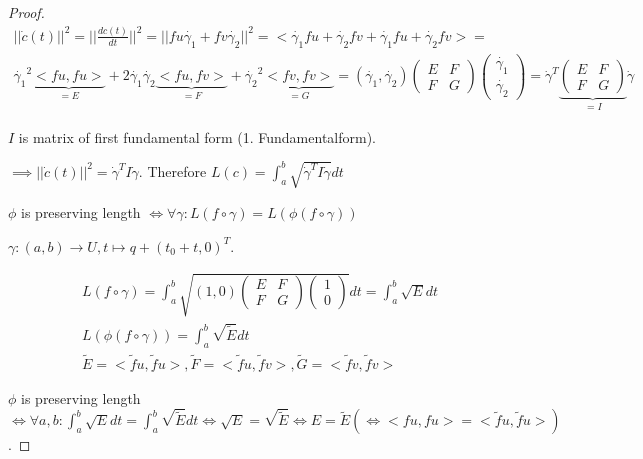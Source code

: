 \documentclass[]{article}
\begin{document}
\begin{proof}
	\begin{align*}
		||\dot{c}(t)||^2 = ||\frac{dc(t)}{dt}||^2 = || fu \dot{\gamma_1} + fv \dot{\gamma_2}||^2 = <\dot{\gamma_1}fu + \dot{\gamma_2} fv + \dot{\gamma_1}fu + \dot{\gamma_2} fv> =\\
		\dot{\gamma_1}^2 \underbrace{<fu, fu>}_{=E} + 2 \dot{\gamma_1} \dot{\gamma_2} \underbrace{<fu, fv>}_{=F} + \dot{\gamma_2}^2 \underbrace{<fv, fv>}_{=G} = (\dot{\gamma_1}, \dot{\gamma_2}) \left(\begin{matrix}
			E & F\\ F & G
		\end{matrix}\right) \left(\begin{matrix}
		\dot{\gamma_1} \\ \dot{\gamma_2}
		\end{matrix}\right) = \dot{\gamma}^T \underbrace{\left(\begin{matrix}
			E & F\\ F & G
		\end{matrix}\right)}_{=I} \dot{\gamma}
	\end{align*}
	
	$I$ is matrix of first fundamental form (1. Fundamentalform).
	
	$\implies ||\dot{c}(t)||^2 = \dot{\gamma}^T I \dot{\gamma}$. Therefore $L(c) = \int_{a}^{b} \sqrt{\dot{\gamma}^T I \dot{\gamma}}dt$
	
	$\phi$ is preserving length $\iff \forall \gamma: L(f\circ \gamma) = L(\phi(f \circ \gamma))$
	
	$\gamma:(a,b) \rightarrow U, t \mapsto q + (t_0+t, 0)^T$.
	
	\begin{align*}
		L(f \circ \gamma) = \int_{a}^{b} \sqrt{(1, 0) \left(\begin{matrix}
				E & F \\ F & G
			\end{matrix}\right) \left(\begin{matrix}
			1 \\ 0
			\end{matrix}\right)} dt = \int_{a}^{b} \sqrt{E} dt\\
		L(\phi(f \circ \gamma)) = \int_{a}^{b} \sqrt{\tilde{E}} dt\\
		\tilde{E} = <\tilde{f}u, \tilde{f}u>, \tilde{F} = <\tilde{f}u, \tilde{f}v>, \tilde{G} = <\tilde{f}v, \tilde{f}v>
	\end{align*}
	
	$\phi$ is preserving length $\iff \forall a,b: \int_{a}^{b} \sqrt{E} dt = \int_{a}^{b} \sqrt{\tilde{E}} dt \iff \sqrt{E} = \sqrt{\tilde{E}} \iff E = \tilde{E} (\iff <fu, fu> = <\tilde{f}u, \tilde{f}u>)$.
	

\end{proof}
\end{document}

